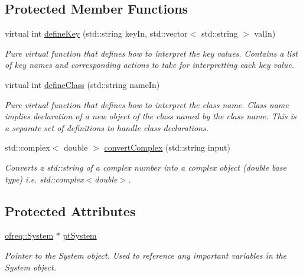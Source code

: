 \subsection*{Protected Member Functions}
\begin{DoxyCompactItemize}
\item 
virtual int \hyperlink{classosea_1_1_dictionary_ae96470181c8b1762204493fa45e96d7c}{define\-Key} (std\-::string key\-In, std\-::vector$<$ std\-::string $>$ val\-In)
\begin{DoxyCompactList}\small\item\em Pure virtual function that defines how to interpret the key values. Contains a list of key names and corresponding actions to take for interpretting each key value. \end{DoxyCompactList}\item 
virtual int \hyperlink{classosea_1_1_dictionary_a42843f64aa966b8c686d9e3750cbdb4b}{define\-Class} (std\-::string name\-In)
\begin{DoxyCompactList}\small\item\em Pure virtual function that defines how to interpret the class name. Class name implies declaration of a new object of the class named by the class name. This is a separate set of definitions to handle class declarations. \end{DoxyCompactList}\item 
std\-::complex$<$ double $>$ \hyperlink{classosea_1_1_dictionary_ac714952a7fcf99ab69de015c606322ad}{convert\-Complex} (std\-::string input)
\begin{DoxyCompactList}\small\item\em Converts a std\-::string of a complex number into a complex object (double base type) i.\-e. std\-::complex$<$double$>$. \end{DoxyCompactList}\end{DoxyCompactItemize}
\subsection*{Protected Attributes}
\begin{DoxyCompactItemize}
\item 
\hypertarget{classosea_1_1_dictionary_a72bf4127a7ee1fb2b784abb6df020fed}{\hyperlink{classosea_1_1ofreq_1_1_system}{ofreq\-::\-System} $\ast$ \hyperlink{classosea_1_1_dictionary_a72bf4127a7ee1fb2b784abb6df020fed}{pt\-System}}\label{classosea_1_1_dictionary_a72bf4127a7ee1fb2b784abb6df020fed}

\begin{DoxyCompactList}\small\item\em Pointer to the System object. Used to reference any important variables in the System object. \end{DoxyCompactList}\end{DoxyCompactItemize}
